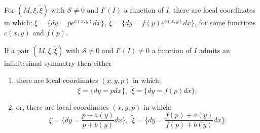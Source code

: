 \documentclass[10pt,a4paper]{amsart}
\begin{document}
\begin{prop}\label{prop:DepGenlnf}
    For $(M, \xi, \tilde \xi)$ with $\mathcal{S}\ne 0$ and $I'(I)$ a function of $I$, there are local coordinates in which: $\xi = \{ dy = p e^{c(x,y)}dx \}, ~\tilde \xi = \{ dy = f(p) e^{c(x,y)}dx\}$,
    for some functions $c(x,y)$ and $f(p)$.
\end{prop}

\begin{prop}\label{prop:SymmsDepGen}
    If a pair $(M, \xi, \tilde \xi)$ with $\mathcal{S}\ne 0$ and $I'(I)\ne 0$ a function of $I$ admits an infinitesimal symmetry then either
    \begin{enumerate}
        \item there are local coordinates $(x,y,p)$ in which:
        \[ \xi = \{ dy = p dx\}, ~~\tilde \xi = \{ dy = f(p) dx\}, \]
        \item or, there are local coordinates $(x,y,p)$ in which:
    \[ \xi = \{  dy = \frac{p + a(y)}{p + b(y)} dx \} , ~~\tilde \xi = \{ dy = \frac{f(p) + a(y)}{f(p) + b(y)} dx \}. \]
    \end{enumerate}
\end{prop}
\end{document}
